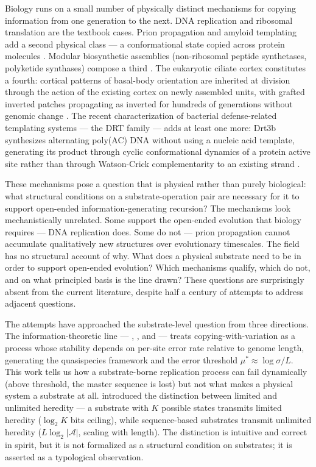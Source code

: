 \documentclass[aps,prx,reprint,amsmath,amssymb,floatfix,superscriptaddress,nofootinbib]{revtex4-2}
\theoremstyle{plain-thm}
\theoremstyle{definition-thm}
\begin{document}
Biology runs on a small number of physically distinct mechanisms for copying information from one generation to the next. DNA replication and ribosomal translation are the textbook cases. Prion propagation and amyloid templating add a second physical class --- a conformational state copied across protein molecules \citep{Greenwald2016}. Modular biosynthetic assemblies (non-ribosomal peptide synthetases, polyketide synthases) compose a third \citep{Walsh2001}. The eukaryotic ciliate cortex constitutes a fourth: cortical patterns of basal-body orientation are inherited at division through the action of the existing cortex on newly assembled units, with grafted inverted patches propagating as inverted for hundreds of generations without genomic change \citep{BeissonSonneborn1965, Frankel1989}. The recent characterization of bacterial defense-related templating systems --- the DRT family \citep{Deng2026, DRT1preprint2026, DRT7preprint2026} --- adds at least one more: Drt3b synthesizes alternating poly(AC) DNA without using a nucleic acid template, generating its product through cyclic conformational dynamics of a protein active site rather than through Watson-Crick complementarity to an existing strand \citep{Deng2026}.

These mechanisms pose a question that is physical rather than purely biological: what structural conditions on a substrate-operation pair are necessary for it to support open-ended information-generating recursion? The mechanisms look mechanistically unrelated. Some support the open-ended evolution that biology requires --- DNA replication does. Some do not --- prion propagation cannot accumulate qualitatively new structures over evolutionary timescales. The field has no structural account of why. What does a physical substrate need to be in order to support open-ended evolution? Which mechanisms qualify, which do not, and on what principled basis is the line drawn? These questions are surprisingly absent from the current literature, despite half a century of attempts to address adjacent questions.

The attempts have approached the substrate-level question from three directions. The information-theoretic line --- \citet{Eigen1971}, \citet{EigenMcCaskillSchuster1989}, and \citet{Szathmary2000} --- treats copying-with-variation as a process whose stability depends on per-site error rate relative to genome length, generating the quasispecies framework and the error threshold $\mu^* \approx \log \sigma / L$. This work tells us how a substrate-borne replication process can fail dynamically (above threshold, the master sequence is lost) but not what makes a physical system a substrate at all. \citet{Szathmary2000} introduced the distinction between limited and unlimited heredity --- a substrate with $K$ possible states transmits limited heredity ($\log_2 K$ bits ceiling), while sequence-based substrates transmit unlimited heredity ($L \log_2 |\mathcal{A}|$, scaling with length). The distinction is intuitive and correct in spirit, but it is not formalized as a structural condition on substrates; it is asserted as a typological observation.
\end{document}
